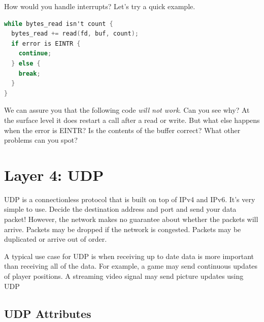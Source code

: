 How would you handle interrupts?
Let's try a quick example.

\begin{lstlisting}[language=C]
while bytes_read isn't count {
  bytes_read += read(fd, buf, count);
  if error is EINTR {
    continue;
  } else {
    break;
  }
}
\end{lstlisting}

We can assure you that the following code \textit{will not work}. Can you see why? At the surface level it does restart a call after a read or write.
But what else happens when the error is EINTR?
Is the contents of the buffer correct?
What other problems can you spot?

\section{Layer 4: UDP}

UDP is a connectionless protocol that is built on top of IPv4 and IPv6.
It's very simple to use.
Decide the destination address and port and send your data packet!
However, the network makes no guarantee about whether the packets will arrive.
Packets may be dropped if the network is congested.
Packets may be duplicated or arrive out of order.

A typical use case for UDP is when receiving up to date data is more important than receiving all of the data.
For example, a game may send continuous updates of player positions.
A streaming video signal may send picture updates using UDP

\subsection{UDP Attributes}

